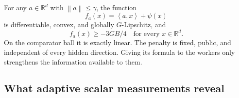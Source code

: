 \documentclass[11pt,a4paper]{article}
\numberwithin{equation}{section}
\theoremstyle{remark}
\newcommand{\R}{\mathbb R}
\newcommand{\norm}[1]{\left\lVert #1\right\rVert}
\newcommand{\ip}[2]{\left\langle #1,#2\right\rangle}
\begin{document}
For any $a\in\R^d$ with $\norm a\le\gamma$, the function
\begin{equation}
 f_a(x)=\ip a x+\psi(x)                  \label{eq:hard-loss}
\end{equation}
is differentiable, convex, and globally $G$-Lipschitz, and
\begin{equation}
 f_a(x)\ge-3GB/4\quad\text{for every }x\in\R^d.
 \label{eq:bounded-below}
\end{equation}
On the comparator ball it is exactly linear. The penalty is fixed,
public, and independent of every hidden direction. Giving its formula
to the workers only strengthens the information available to them.

\subsection{What adaptive scalar measurements reveal}
\end{document}
